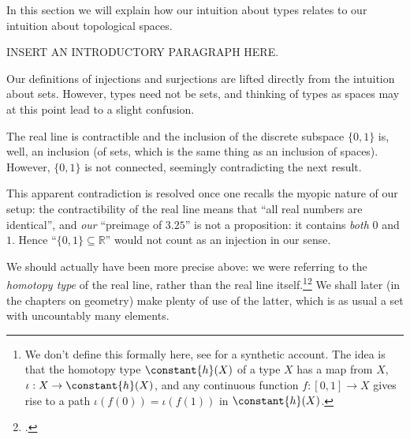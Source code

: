 In this section we will explain how our intuition about types relates to our intuition about topological spaces.

INSERT AN INTRODUCTORY PARAGRAPH HERE.

\begin{remark}
  \label{rem:injectionsurjectionisnotwhatyouthink}
  Our definitions of injections and surjections are lifted directly from the intuition about sets.  However, types need not be sets, and
  thinking of types as spaces may at this point lead to a slight confusion.

  The real line is contractible and the inclusion of the discrete subspace $\{0,1\}$ is, well, an inclusion (of sets, which is the same thing as
  an inclusion of spaces).  However, $\{0,1\}$ is not connected, seemingly contradicting the next result.

  This apparent contradiction is resolved once one recalls the myopic nature of our setup: the contractibility of the real line means that ``all
  real numbers are identical'', and \emph{our} ``preimage of $3{.}25$'' is not a proposition: it contains \emph{both} $0$ and $1$.  Hence
  ``$\{0,1\}\subseteq\mathbb R$'' would not count as an injection in our sense.

  We should actually have been more precise above: we were referring to the \emph{homotopy type} of the real line, rather than the real line itself.\footnote{\label{ft:cohesive}%
    We don't define this formally here,
    see \citeauthor{Shulman-Real-Cohesive}\footnotemark{} for a synthetic account.
    The idea is that the homotopy type $\constant{h}(X)$ of a type $X$
    has a map from $X$, $\iota : X \to \constant{h}(X)$,
    and any continuous function $f : [0,1] \to X$
    gives rise to a path
    $\iota(f(0)) = \iota(f(1))$ in
    $\constant{h}(X)$.}\footcitetext{Shulman-Real-Cohesive}
  We shall later (in the chapters on geometry) make plenty of use of the latter,
  which is as usual a set with uncountably many elements.
\end{remark}

